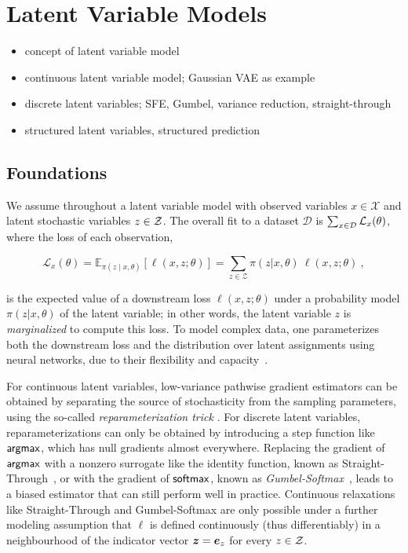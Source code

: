 \section{Latent Variable Models}
\label{sec:lvm}

\begin{itemize}
        \item concept of latent variable model
        \item continuous latent variable model; Gaussian VAE as example
        \item discrete latent variables; SFE, Gumbel, variance reduction, straight-through
        \item structured latent variables, structured prediction
\end{itemize}

\subsection{Foundations}

We assume throughout a latent variable model with observed variables
$x \in \mathcal{X}$ and latent stochastic variables $z \in \mathcal{Z}$. The
overall fit to a dataset $\mathcal D$ is $\sum_{x \in \mathcal{D}}
        \mathcal{L}_x(\theta)$, where the loss of each observation,

\begin{equation}\label{eq:fit}
        \mathcal{L}_{x}(\theta) =
        \mathbb E_{\pi(z \mid x, \theta)}
        \left[ \ell(x, z; \theta)\right] =
        \sum_{z \in \mathcal Z} \pi(z | x, \theta)~\ell(x, z; \theta) ~,
\end{equation}

\noindent is the expected value of a downstream loss $\ell(x,z;\theta)$ under a
probability model $\pi(z|x,\theta)$ of the latent variable; in other
words, the latent variable $z$ is {\it marginalized} to compute this loss.
To model complex data, one parameterizes both the downstream loss and
the distribution over latent assignments using neural networks, due
to their flexibility and capacity~\citep{Kingma+2014:VAE}.

For continuous latent variables,
low-variance pathwise gradient estimators can be obtained by
separating the source of stochasticity from the sampling parameters,
using the so-called \emph{reparameterization trick}
\citep{Kingma+2014:VAE,RezendeEtAl14VAE}. For discrete latent
variables, reparameterizations can only be obtained by introducing a
step function like $\operatorname*{\mathsf{argmax}}$, which has null gradients almost everywhere.
Replacing the gradient of $\operatorname*{\mathsf{argmax}}$ with a nonzero surrogate like the identity
function, known as Straight-Through~\citep{STE}, or with the gradient of $\operatorname*{\mathsf{softmax}}$, known
as \emph{Gumbel-Softmax}~\citep{Concrete,GumbelSoftmax}, leads to a
biased estimator that can still perform well in practice. Continuous
relaxations like Straight-Through and Gumbel-Softmax are only
possible under a further modeling assumption that $\ell$ is defined
continuously (thus differentiably) in a neighbourhood of the
indicator vector $\bm{z} = \bm{e}_{z}$ for every $z \in \mathcal{Z}$.

